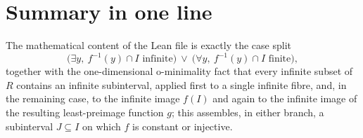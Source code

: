 \documentclass[11pt]{article}
\begin{document}
\section{Summary in one line}
 
The mathematical content of the Lean file is exactly the case split
\[
  \bigl(\exists y,\ f^{-1}(y)\cap I \text{ infinite}\bigr)
  \ \vee\
  \bigl(\forall y,\ f^{-1}(y)\cap I \text{ finite}\bigr),
\]
together with the one-dimensional o-minimality fact that every infinite subset of $R$ contains an
infinite subinterval, applied first to a single infinite fibre, and, in the remaining case, to the
infinite image $f(I)$ and again to the infinite image of the resulting least-preimage function
$g$; this assembles, in either branch, a subinterval $J\subseteq I$ on which $f$ is constant or
injective.
 
\end{document}
